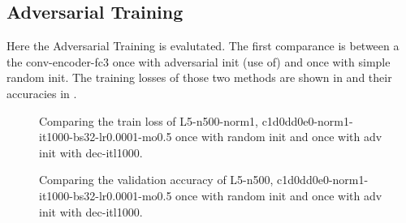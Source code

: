 \subsection{Adversarial Training}
Here the Adversarial Training is evalutated.
The first comparance is between a the conv-encoder-fc3 once with adversarial init (use of) and once with simple random init.
The training losses of those two methods are shown in  and their accuracies in .

\begin{figure}[!ht]
  \centering
  \caption{Comparing the train loss of L5-n500-norm1, c1d0dd0e0-norm1-it1000-bs32-lr0.0001-mo0.5 once with random init and once with adv init with dec-itl1000.}
  \label{fig:ml_adv_fc3_train_loss}
\end{figure}
\FloatBarrier
\noindent

\begin{figure}[!ht]
  \centering
  \caption{Comparing the validation accuracy of L5-n500, c1d0dd0e0-norm1-it1000-bs32-lr0.0001-mo0.5 once with random init and once with adv init with dec-itl1000.}
  \label{fig:ml_adv_fc3_val_acc}
\end{figure}
\FloatBarrier
\noindent

